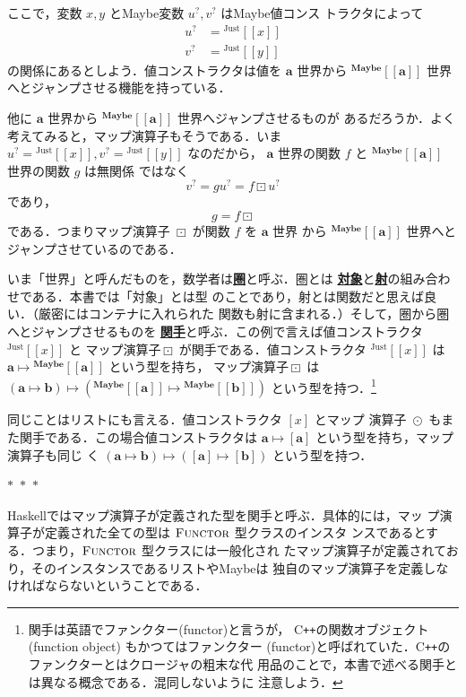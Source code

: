 \documentclass[a5paper,twoside,fleqn,draft]{jsbook}
\def\[{\left[\!\left[}
\def\]{\right]\!\right]}
\newcommand{\separator}{\begin{center}$*$~$*$~$*$\end{center}}
\newcommand{\programminglanguage}[1]{\textsf{#1}}
\newcommand{\cxx}{\programminglanguage{C}\texttt{++}}
\newcommand{\haskell}{\programminglanguage{Haskell}}
\newcommand{\keyword}[1]{{\underline{\textbf{#1}}}}
\DeclareMathOperator{\mMapList}{\odot}
\DeclareMathOperator{\mMapMaybe}{\boxdot}
\DeclareMathOperator{\mMapsTo}{\mapsto}
\newcommand{\mType}[1]{\mathbf{#1}}
\newcommand{\mListType}[1]{[\mType{#1}]}
\newcommand{\mGenericTypeAssemble}[2]{{}^{\mType{#1}}\[\mType{#2}\]}
\newcommand{\mMaybeType}[1]{\mGenericTypeAssemble{Maybe}{#1}}
\newcommand{\mValueConstructor}[1]{\mathrm{#1}}
\newcommand{\mGenericValueAssemble}[2]{{}^\mValueConstructor{#1}\[#2\]}
\newcommand{\mJustWith}[1]{\mGenericValueAssemble{Just}{#1}}
\newcommand{\mListWith}[1]{\left[#1\right]}
\newcommand{\mGenericTypeClass}[1]{\textsc{#1}} %
\newcommand{\mFunctorTypeClass}{\mGenericTypeClass{Functor}}
\newcommand{\mMaybe}[1]{{#1}^?}
\newcommand{\mProj}[2]{#1\mMapsTo#2}
\begin{document}
ここで，変数 $x,y$ とMaybe変数 $\mMaybe{u},\mMaybe{v}$ はMaybe値コンス
トラクタによって
\begin{align}
\mMaybe{u}&=\mJustWith{x}\\
\mMaybe{v}&=\mJustWith{y}
\end{align}
の関係にあるとしよう．値コンストラクタは値を $\mType{a}$ 世界から
$\mMaybeType{a}$ 世界へとジャンプさせる機能を持っている．

他に $\mType{a}$ 世界から $\mMaybeType{a}$ 世界へジャンプさせるものが
あるだろうか．よく考えてみると，マップ演算子もそうである．いま
$\mMaybe{u}=\mJustWith{x},\mMaybe{v}=\mJustWith{y}$ なのだから，
$\mType{a}$ 世界の関数 $f$ と $\mMaybeType{a}$ 世界の関数 $g$ は無関係
ではなく
\begin{equation}
\mMaybe{v}=g\mMaybe{u}=f\mMapMaybe\mMaybe{u}
\end{equation}
であり，
\begin{equation}
g=f\mMapMaybe
\end{equation}
である．つまりマップ演算子 $\mMapMaybe$ が関数 $f$ を $\mType{a}$ 世界
から $\mMaybeType{a}$ 世界へとジャンプさせているのである．

いま「世界」と呼んだものを，数学者は\keyword{圏}と呼ぶ．圏とは
\keyword{対象}と\keyword{射}の組み合わせである．本書では「対象」とは型
のことであり，射とは関数だと思えば良い．（厳密にはコンテナに入れられた
関数も射に含まれる．）そして，圏から圏へとジャンプさせるものを
\keyword{関手}と呼ぶ．この例で言えば値コンストラクタ $\mJustWith{x}$ と
マップ演算子$\mMapMaybe$ が関手である．値コンストラクタ
$\mJustWith{x}$ は$\mProj{\mType{a}}{\mMaybeType{a}}$ という型を持ち，
マップ演算子$\mMapMaybe$ は
$\mProj{(\mProj{\mType{a}}{\mType{b}})}{(\mProj{\mMaybeType{a}}{\mMaybeType{b}})}$
という型を持つ．\footnote{関手は英語でファンクター(functor)と言うが，
\cxx の関数オブジェクト (function object) もかつてはファンクター
(functor)と呼ばれていた．\cxx のファンクターとはクロージャの粗末な代
用品のことで，本書で述べる関手とは異なる概念である．混同しないように
注意しよう．}

同じことはリストにも言える．値コンストラクタ $\mListWith{x}$ とマップ
演算子 $\mMapList$ もまた関手である．この場合値コンストラクタは
$\mProj{\mType{a}}{\mListType{a}}$ という型を持ち，マップ演算子も同じ
く
$\mProj{(\mProj{\mType{a}}{\mType{b}})}{(\mProj{\mListType{a}}{\mListType{b}})}$
という型を持つ．

\separator

\haskell ではマップ演算子が定義された型を関手と呼ぶ．具体的には，マッ
プ演算子が定義された全ての型は $\mFunctorTypeClass$ 型クラスのインスタ
ンスであるとする．つまり，$\mFunctorTypeClass$ 型クラスには一般化され
たマップ演算子が定義されており，そのインスタンスであるリストやMaybeは
独自のマップ演算子を定義しなければならないということである．
\end{document}
